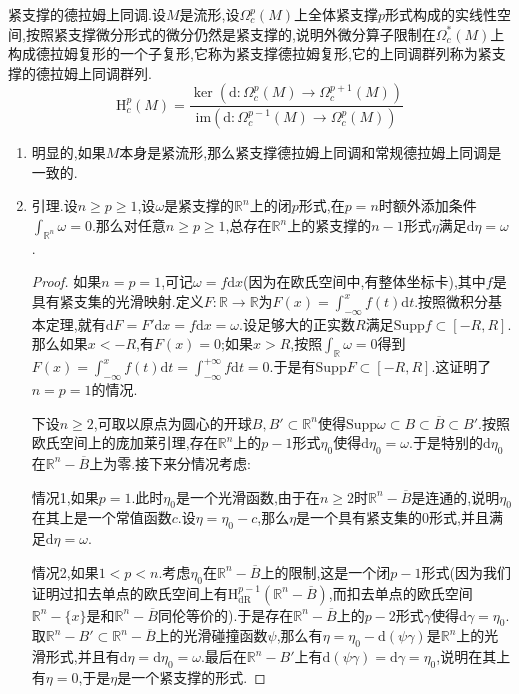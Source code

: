 紧支撑的德拉姆上同调.设$M$是流形,设$\Omega_c^p(M)$上全体紧支撑$p$形式构成的实线性空间,按照紧支撑微分形式的微分仍然是紧支撑的,说明外微分算子限制在$\Omega_c^*(M)$上构成德拉姆复形的一个子复形,它称为紧支撑德拉姆复形,它的上同调群列称为紧支撑的德拉姆上同调群列.
$$\mathrm{H}_c^p(M)=\frac{\ker\left(\mathrm{d}:\Omega_c^p(M)\to\Omega_c^{p+1}(M)\right)}{\mathrm{im}\left(\mathrm{d}:\Omega_c^{p-1}(M)\to\Omega_c^p(M)\right)}$$
\begin{enumerate}
	\item 明显的,如果$M$本身是紧流形,那么紧支撑德拉姆上同调和常规德拉姆上同调是一致的.
	\item 引理.设$n\ge p\ge1$,设$\omega$是紧支撑的$\mathbb{R}^n$上的闭$p$形式,在$p=n$时额外添加条件$\int_{\mathbb{R}^n}\omega=0$.那么对任意$n\ge p\ge1$,总存在$\mathbb{R}^n$上的紧支撑的$n-1$形式$\eta$满足$\mathrm{d}\eta=\omega$.
	\begin{proof}
		
		如果$n=p=1$,可记$\omega=f\mathrm{d}x$(因为在欧氏空间中,有整体坐标卡),其中$f$是具有紧支集的光滑映射.定义$F:\mathbb{R}\to\mathbb{R}$为$F(x)=\int_{-\infty}^xf(t)\mathrm{d}t$.按照微积分基本定理,就有$\mathrm{d}F=F'\mathrm{d}x=f\mathrm{d}x=\omega$.设足够大的正实数$R$满足$\mathrm{Supp}f\subset [-R,R]$.那么如果$x<-R$,有$F(x)=0$;如果$x>R$,按照$\int_{\mathbb{R}}\omega=0$得到$F(x)=\int_{-\infty}^xf(t)\mathrm{d}t=\int_{-\infty}^{+\infty}f\mathrm{d}t=0$.于是有$\mathrm{Supp}F\subset[-R,R]$.这证明了$n=p=1$的情况.
		
		下设$n\ge2$,可取以原点为圆心的开球$B,B'\subset\mathbb{R}^n$使得$\mathrm{Supp}\omega\subset B\subset\overline{B}\subset B'$.按照欧氏空间上的庞加莱引理,存在$\mathbb{R}^n$上的$p-1$形式$\eta_0$使得$\mathrm{d}\eta_0=\omega$.于是特别的$\mathrm{d}\eta_0$在$\mathbb{R}^n-\overline{B}$上为零.接下来分情况考虑:
		
		情况1,如果$p=1$.此时$\eta_0$是一个光滑函数,由于在$n\ge2$时$\mathbb{R}^n-\overline{B}$是连通的,说明$\eta_0$在其上是一个常值函数$c$.设$\eta=\eta_0-c$,那么$\eta$是一个具有紧支集的0形式,并且满足$\mathrm{d}\eta=\omega$.
		
		情况2,如果$1<p<n$.考虑$\eta_0$在$\mathbb{R}^n-\overline{B}$上的限制,这是一个闭$p-1$形式(因为我们证明过扣去单点的欧氏空间上有$\mathrm{H}_{\mathrm{dR}}^{p-1}(\mathbb{R}^n-\overline{B})$,而扣去单点的欧氏空间$\mathbb{R}^n-\{x\}$是和$\mathbb{R}^n-\overline{B}$同伦等价的).于是存在$\mathbb{R}^n-\overline{B}$上的$p-2$形式$\gamma$使得$\mathrm{d}\gamma=\eta_0$.取$\mathbb{R}^n-B'\subset\mathbb{R}^n-\overline{B}$上的光滑碰撞函数$\psi$,那么有$\eta=\eta_0-\mathrm{d}(\psi\gamma)$是$\mathbb{R}^n$上的光滑形式,并且有$\mathrm{d}\eta=\mathrm{d}\eta_0=\omega$.最后在$\mathbb{R}^n-B'$上有$\mathrm{d}(\psi\gamma)=\mathrm{d}\gamma=\eta_0$,说明在其上有$\eta=0$,于是$\eta$是一个紧支撑的形式.
		

\end{proof}
\end{enumerate}
